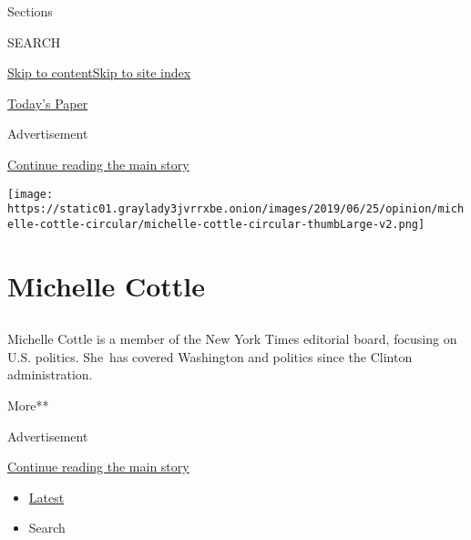 Sections

SEARCH

\protect\hyperlink{site-content}{Skip to
content}\protect\hyperlink{site-index}{Skip to site index}

\href{https://myaccount.nytimes3xbfgragh.onion/auth/login?response_type=cookie\&client_id=vi}{}

\href{https://www.nytimes3xbfgragh.onion/section/todayspaper}{Today's
Paper}

Advertisement

\protect\hyperlink{after-top}{Continue reading the main story}

\texttt{[image: https://static01.graylady3jvrrxbe.onion/images/2019/06/25/opinion/michelle-cottle-circular/michelle-cottle-circular-thumbLarge-v2.png]}

\hypertarget{michelle-cottle}{%
\section{Michelle Cottle}\label{michelle-cottle}}

\subsection{}

Michelle Cottle is a member of the New York Times editorial board,
focusing on U.S. politics. She~has covered Washington and politics since
the Clinton administration.

More**

Advertisement

\protect\hyperlink{after-mid1}{Continue reading the main story}

\begin{itemize}
\tightlist
\item
  \protect\hyperlink{stream-panel}{Latest}
\item
  Search
\end{itemize}

